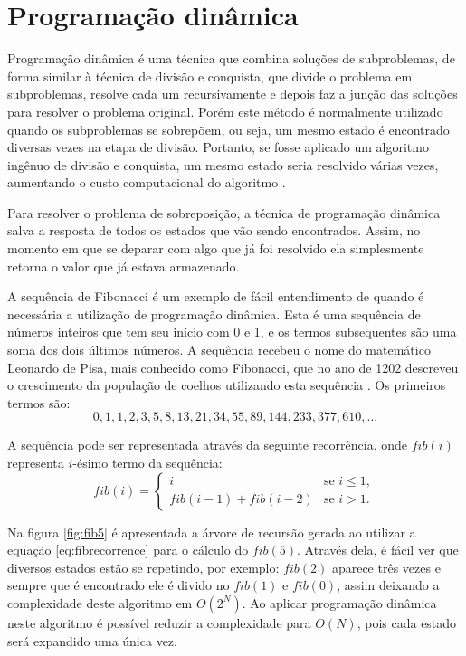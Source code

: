 \section{Programação dinâmica}
\label{sec:pd}

Programação dinâmica é uma técnica que combina soluções de subproblemas, de forma similar à técnica de divisão e conquista, que divide o problema em subproblemas, resolve cada um recursivamente e depois faz a junção das soluções para resolver o problema original. Porém este método é normalmente utilizado quando os subproblemas se sobrepõem, ou seja, um mesmo estado é encontrado diversas vezes na etapa de divisão. Portanto, se fosse aplicado um algoritmo ingênuo de divisão e conquista, um mesmo estado seria resolvido várias vezes, aumentando o custo computacional do algoritmo \cite{Cormen09a}. 

Para resolver o problema de sobreposição, a técnica de programação dinâmica salva a resposta de todos os estados que vão sendo encontrados. Assim, no momento em que se deparar com algo que já foi resolvido ela simplesmente retorna o valor que já estava armazenado. 

A sequência de Fibonacci é um exemplo de fácil entendimento de quando é necessária a utilização de programação dinâmica. Esta é uma sequência de números inteiros que tem seu início com 0 e 1, e os termos subsequentes são uma soma dos dois últimos números. A sequência recebeu o nome do matemático Leonardo de Pisa, mais conhecido como Fibonacci, que no ano de 1202 descreveu o crescimento da população de coelhos utilizando esta sequência \cite{LiveScience2013}. Os primeiros termos são:
\begin{equation}
0, 1, 1, 2, 3, 5, 8, 13, 21, 34, 55, 89, 144, 233, 377, 610, ...
\label{eq:fib}
\end{equation}

A sequência pode ser representada através da seguinte recorrência, onde $fib(i)$ representa $i$-ésimo termo da sequência:
\begin{equation}
fib(i)=
\begin{cases}
i &\text{se } i \leq{1},\\
fib(i - 1) + fib(i - 2) &\text{se } i > {1}.
\end{cases}
\label{eq:fibrecorrence}
\end{equation}

Na figura \ref{fig:fib5} é apresentada a árvore de recursão gerada ao utilizar a equação \ref{eq:fibrecorrence} para o cálculo do $fib(5)$. Através dela, é fácil ver que diversos estados estão se repetindo, por exemplo: $fib(2)$ aparece três vezes e sempre que é encontrado ele é divido no $fib(1)$ e $fib(0)$, assim deixando a  complexidade deste algoritmo em $O(2^{N})$. Ao aplicar programação dinâmica neste algoritmo é possível reduzir a complexidade para $O(N)$, pois cada estado será expandido uma única vez.

